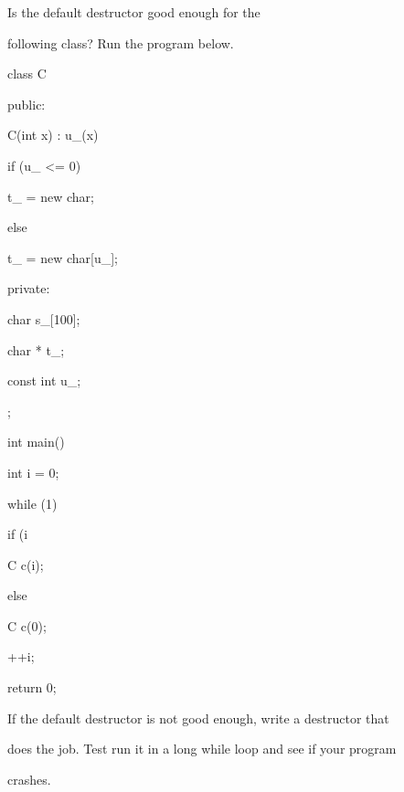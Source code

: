 Is the default destructor good enough for the

following class? Run the program below.



\begin{consolethree}[escapeinside=||]

class C

{

public:

    C(int x) : u_(x)

    {

        if (u_ <= 0)

        {

            t_ = new char;

        }

        else

        {

            t_ = new char[u_];

        }

    }

private:

    char s_[100];

    char * t_;

    const int u_;

};



int main()

{

    int i = 0;

    while (1)

    {

        if (i %

        {

            C c(i);

        }

        else

        {

            C c(0);

        }

        ++i;

    }

    return 0;

}

\end{consolethree}



If the default destructor is not good enough, write a destructor that

does the job. Test run it in a long while loop and see if your program

crashes.

